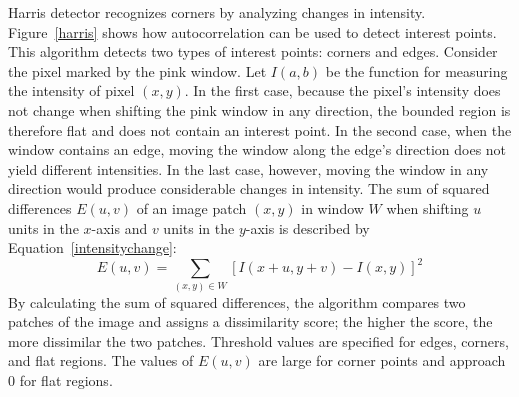 \begin{figure}[!ht]
\end{figure}
Harris detector recognizes corners by analyzing changes in intensity. Figure~\ref{harris} shows how autocorrelation can be used to detect interest points. This algorithm detects two types of interest points: corners and edges. Consider the pixel marked by the pink window. Let $I(a, b)$ be the function for measuring the intensity of pixel $(x,y)$. In the first case, because the pixel's intensity does not change when shifting the pink window in any direction, the bounded region is therefore flat and does not contain an interest point. In the second case, when the window contains an edge, moving the window along the edge's direction does not yield different intensities. In the last case, however, moving the window in any direction would produce considerable changes in intensity. The sum of squared differences $E(u, v)$ of an image patch $(x, y)$ in window $W$ when shifting $u$ units in the $x$-axis and $v$ units in the $y$-axis is described by Equation~\ref{intensitychange}:
\begin{equation}\label{intensitychange}
E(u,v) = \sum\limits_{(x, y) \in W} [I(x + u, y + v) - I(x, y)]^2
\end{equation}
By calculating the sum of squared differences, the algorithm compares two patches of the image and assigns a dissimilarity score; the higher the score, the more dissimilar the two patches. Threshold values are specified for edges, corners, and flat regions. The values of $E(u,v)$ are large for corner points and approach $0$ for flat regions.

